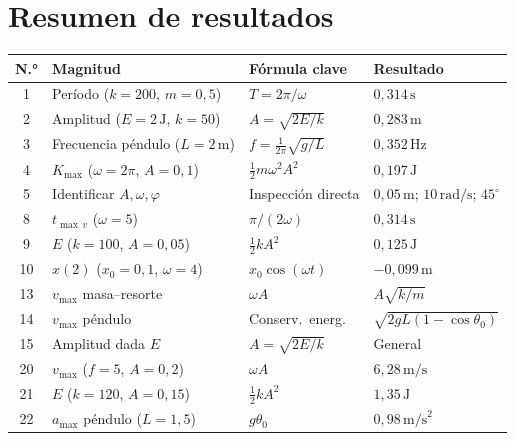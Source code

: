 \documentclass[12pt, a4paper, oneside]{book}
\begin{document}
\chapter{Resumen de resultados}

\begin{center}
\renewcommand{\arraystretch}{1.7}
\begin{tabular}{clll}
\toprule
\textbf{N.°} & \textbf{Magnitud} & \textbf{F\'ormula clave} & \textbf{Resultado} \\
\midrule
1  & Per\'iodo ($k{=}200$, $m{=}0{,}5$)         & $T=2\pi/\omega$             & $0{,}314\,\text{s}$ \\
2  & Amplitud ($E{=}2\,\text{J}$, $k{=}50$)     & $A=\sqrt{2E/k}$             & $0{,}283\,\text{m}$ \\
3  & Frecuencia p\'endulo ($L{=}2\,\text{m}$)   & $f=\frac{1}{2\pi}\sqrt{g/L}$& $0{,}352\,\text{Hz}$ \\
4  & $K_{\max}$ ($\omega{=}2\pi$, $A{=}0{,}1$)  & $\frac{1}{2}m\omega^2A^2$   & $0{,}197\,\text{J}$ \\
5  & Identificar $A,\omega,\varphi$              & Inspecci\'on directa        & $0{,}05\,\text{m}$; $10\,\text{rad/s}$; $45^\circ$ \\
8  & $t_{\max\,v}$ ($\omega{=}5$)               & $\pi/(2\omega)$             & $0{,}314\,\text{s}$ \\
9  & $E$ ($k{=}100$, $A{=}0{,}05$)              & $\frac{1}{2}kA^2$           & $0{,}125\,\text{J}$ \\
10 & $x(2)$ ($x_0{=}0{,}1$, $\omega{=}4$)       & $x_0\cos(\omega t)$         & $-0{,}099\,\text{m}$ \\
13 & $v_{\max}$ masa--resorte                   & $\omega A$                  & $A\sqrt{k/m}$ \\
14 & $v_{\max}$ p\'endulo                       & Conserv.\ energ.            & $\sqrt{2gL(1{-}\cos\theta_0)}$ \\
15 & Amplitud dada $E$                          & $A=\sqrt{2E/k}$             & General \\
20 & $v_{\max}$ ($f{=}5$, $A{=}0{,}2$)          & $\omega A$                  & $6{,}28\,\text{m/s}$ \\
21 & $E$ ($k{=}120$, $A{=}0{,}15$)              & $\frac{1}{2}kA^2$           & $1{,}35\,\text{J}$ \\
22 & $a_{\max}$ p\'endulo ($L{=}1{,}5$)         & $g\theta_0$                 & $0{,}98\,\text{m/s}^2$ \\

\end{tabular}
\end{center}
\end{document}

